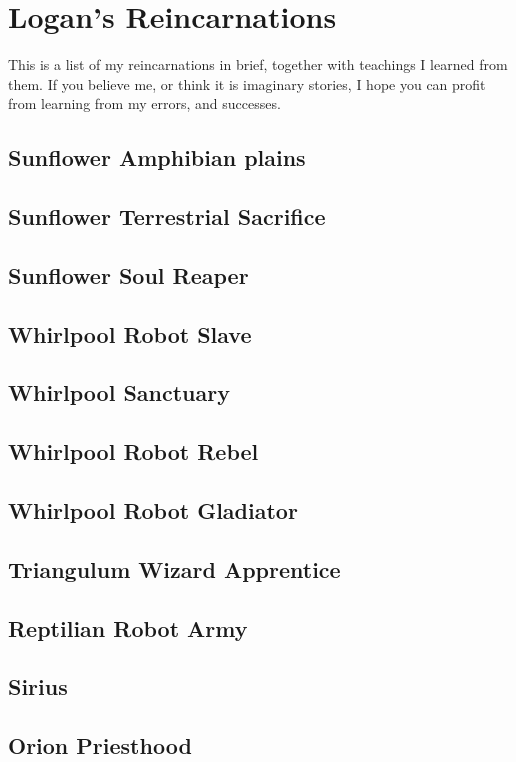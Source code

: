 \part{Logan's Reincarnations}
\label{reincarnation}

This is a list of my reincarnations in brief, together with teachings I learned
from them. 
If you believe me, or think it is imaginary stories, 
I hope you can profit from learning from my errors, and successes.

\chapter{Sunflower Amphibian plains}
\chapter{Sunflower Terrestrial Sacrifice}
\chapter{Sunflower Soul Reaper}
\chapter{Whirlpool Robot Slave}
\chapter{Whirlpool Sanctuary}
\chapter{Whirlpool Robot Rebel}
\chapter{Whirlpool Robot Gladiator}
\chapter{Triangulum Wizard Apprentice}
\chapter{Reptilian Robot Army}
\chapter{Sirius}
\chapter{Orion Priesthood}
